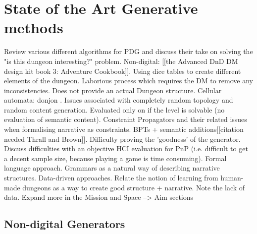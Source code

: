 \documentclass{UoYCSproject}
\begin{document}
\section{State of the Art Generative methods}
\begin{outline}
  \1 Review various different algorithms for PDG and discuss their take on solving the "is this dungeon interesting?" problem.
    \2 Non-digital: [[the Advanced DnD DM design kit book 3: Adventure Cookbook]]. Using dice tables to create different elements of the dungeon. Laborious process which requires the DM to remove any inconsistencies. Does not provide an actual Dungeon structure.
    \2 Cellular automata: donjon \parencite{donjonCA}. Issues associated with completely random topology and random content generation. Evaluated only on if the level is solvable (no evaluation of semantic content).
    \2 Constraint Propagators and their related issues when formalising narrative as constraints.
    \2 BPTs + semantic additions[[citation needed Thrall and Brown]]. Difficulty proving the 'goodness' of the generator. Discuss difficulties with an objective HCI evaluation for PnP (i.e. difficult to get a decent sample size, because playing a game is time consuming).
    \2 Formal language approach. Grammars \parencite{DormansMS,Deery,Cadogan} as a natural way of describing narrative structures.
    \2 Data-driven approaches. \parencite{SummervilleLearningOfZelda,SummervillePCGML,SummervilleSamplingHyrule} Relate the notion of learning from human-made dungeons as a way to create good structure + narrative. Note the lack of data. Expand more in the Mission and Space --> Aim sections
\end{outline}



\subsection{Non-digital Generators}
\end{document}
